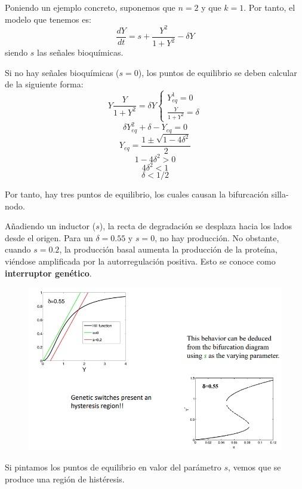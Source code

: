 Poniendo un ejemplo concreto, suponemos que $n = 2$ y que $k = 1$. Por tanto, el modelo que tenemos es:
$$\frac{dY}{dt} = s + \frac{Y^2}{1 + Y^2} - \delta Y$$
siendo $s$ las señales bioquímicas. 

Si no hay señales bioquímicas ($s=0$), los puntos de equilibrio se deben calcular de la siguiente forma:
$$Y \frac{Y}{1 + Y^2} = \delta Y \begin{cases}
Y^1_{eq} = 0 \\
\frac{Y}{1 + Y^2} = \delta
\end{cases}
$$
$$\delta Y^2_{eq} + \delta - Y_{eq} = 0$$
$$Y_{eq} = \frac{1 \pm \sqrt{1 - 4 \delta^2}}{2}$$
$$1 - 4 \delta^2 > 0 $$
$$4 \delta^2 < 1$$
$$\delta < 1/2$$

Por tanto, hay tres puntos de equilibrio, los cuales causan la bifurcación silla-nodo. 

Añadiendo un inductor ($s$), la recta de degradación se desplaza hacia los lados desde el origen. Para un $\delta = 0.55$ y $s=0$, no hay producción. No obstante, cuando $s = 0.2$, la producción basal aumenta la producción de la proteína, viéndose amplificada por la autorregulación positiva. Esto se conoce como \textbf{interruptor genético}.  

\begin{figure}[h]
\centering
\includegraphics[width = \textwidth]{figs/genetic-switch.png}
\end{figure}

Si pintamos los puntos de equilibrio en valor del parámetro $s$, vemos que se produce una región de histéresis. 

